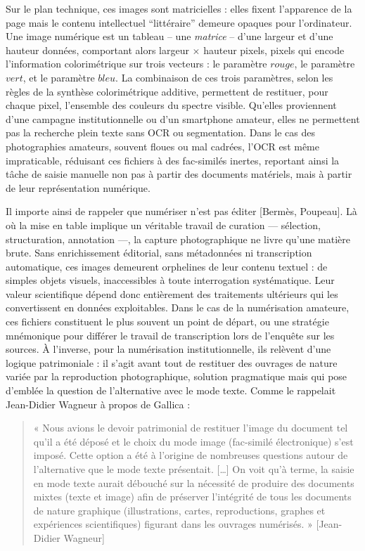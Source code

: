 Sur le plan technique, ces images sont matricielles : elles fixent l’apparence de la page mais le contenu intellectuel \enquote{littéraire} demeure opaques pour l’ordinateur. Une image numérique est un tableau -- une \emph{matrice} -- d'une largeur et d'une hauteur données, comportant alors largeur $\times$ hauteur pixels, pixels qui encode l'information colorimétrique sur trois vecteurs : le paramètre $rouge$, le paramètre $vert$, et le paramètre $bleu$. La combinaison de ces trois paramètres, selon les règles de la synthèse colorimétrique additive, permettent de restituer, pour chaque pixel, l'ensemble des couleurs du spectre visible. Qu’elles proviennent d’une campagne institutionnelle ou d’un smartphone amateur, elles ne permettent pas la recherche plein texte sans OCR ou segmentation. Dans le cas des photographies amateurs, souvent floues ou mal cadrées, l’OCR est même impraticable, réduisant ces fichiers à des fac-similés inertes, reportant ainsi la tâche de saisie manuelle non pas à partir des documents matériels, mais à partir de leur représentation numérique.

Il importe ainsi de rappeler que numériser n’est pas éditer [Bermès, Poupeau]. Là où la mise en table implique un véritable travail de curation — sélection, structuration, annotation —, la capture photographique ne livre qu’une matière brute. Sans enrichissement éditorial, sans métadonnées ni transcription automatique, ces images demeurent orphelines de leur contenu textuel : de simples objets visuels, inaccessibles à toute interrogation systématique. Leur valeur scientifique dépend donc entièrement des traitements ultérieurs qui les convertissent en données exploitables. Dans le cas de la numérisation amateure, ces fichiers constituent le plus souvent un point de départ, ou une stratégie mnémonique pour différer le travail de transcription lors de l’enquête sur les sources. À l’inverse, pour la numérisation institutionnelle, ils relèvent d’une logique patrimoniale : il s’agit avant tout de restituer des ouvrages de nature variée par la reproduction photographique, solution pragmatique mais qui pose d’emblée la question de l’alternative avec le mode texte. Comme le rappelait Jean-Didier Wagneur à propos de Gallica :

\begin{quote}« Nous avions le devoir patrimonial de restituer l’image du document tel qu’il a été déposé et le choix du mode image (fac-similé électronique) s’est imposé. Cette option a été à l’origine de nombreuses questions autour de l’alternative que le mode texte présentait. […] On voit qu’à terme, la saisie en mode texte aurait débouché sur la nécessité de produire des documents mixtes (texte et image) afin de préserver l’intégrité de tous les documents de nature graphique (illustrations, cartes, reproductions, graphes et expériences scientifiques) figurant dans les ouvrages numérisés. » [Jean-Didier Wagneur]\end{quote}

